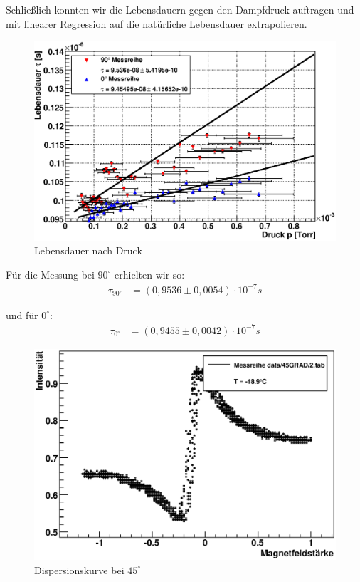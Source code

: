 \documentclass[12pt]{article}
\begin{document}
Schließlich konnten wir die Lebensdauern gegen den Dampfdruck auftragen und mit linearer Regression auf die natürliche Lebensdauer extrapolieren.

\begin{figure}[H]  
\centering
\includegraphics[width=0.9\linewidth]{pictures/lebensdauer_druck.eps}
\caption{Lebensdauer nach Druck}
\end{figure}

Für die Messung bei $90^\circ$ erhielten wir so:
\begin{align}
 \tau_{90^\circ} &= (0,9536 \pm 0,0054) \cdot 10^{-7}s
\end{align}

und für $0^\circ$:
\begin{align}
 \tau_{0^\circ} &= (0,9455 \pm 0,0042) \cdot 10^{-7}s
\end{align}


\begin{figure}[H]  
\centering
\includegraphics[width=0.9\linewidth]{pictures/dispersion.eps}
\caption{Dispersionskurve bei $45^\circ$}
\end{figure}
\end{document}
